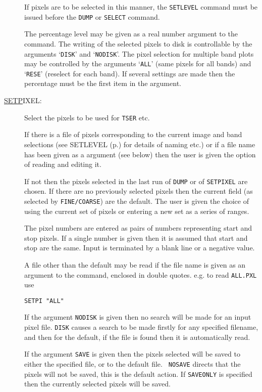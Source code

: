 \begin{description}
If pixels are to be selected in this manner, the {\tt SETLEVEL} command
must be issued before the {\tt DUMP} or {\tt SELECT} command.

The percentage level may be given as a real number argument to the
command.  The writing of the selected pixels to disk is controllable by
the arguments `{\tt DISK}' and `{\tt NODISK}'. The pixel selection for
multiple band plots may be controlled by the arguments `{\tt ALL}'
(same pixels for all bands) and `{\tt RESE}' (reselect for each band).
If several settings are made then the percentage must be the first item
in the argument.

\item[\underline{SETP}IXEL: ] \label{setp}
Select the pixels to be used for {\tt TSER} etc.

If there is a file of pixels corresponding to the current image and
band selections (see SETLEVEL (p.\pageref{setl}) for details of naming
etc.) or if a file name has been given as a argument (see below) then
the user is given the option of reading and editing it.

If not then the pixels selected in the last run of {\tt DUMP} or of
{\tt SETPIXEL} are chosen. If there are no previously selected pixels
then the current field (as selected by {\tt FINE/COARSE}) are the
default. The user is given the choice of using the current set of
pixels or entering a new set as a series of ranges.

The pixel numbers are entered as pairs of numbers representing start
and stop pixels. If a single number is given then it is assumed that
start and stop are the same. Input is terminated by a blank line or a
negative value.

A file other than the default may be read if the file name is given as
an argument to the command, enclosed in double quotes. e.g. to read
{\tt ALL.PXL} use
\begin{verbatim}
SETPI "ALL"
\end{verbatim}

If the argument {\tt NODISK} is given then no search will be made for
an input pixel file. {\tt DISK} causes a search to be made firstly for
any specified filename, and then for the default, if the file is found
then it is automatically read.

If the argument {\tt SAVE} is given then the pixels selected will be
saved to either the specified file, or to the default file. {\tt
NOSAVE} directs that the pixels will not be saved, this is the default
action. If {\tt SAVEONLY} is specified then the currently selected
pixels will be saved.


\end{description}
